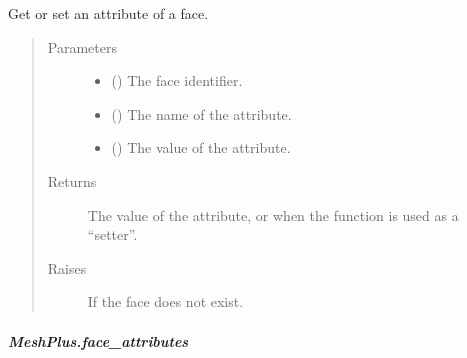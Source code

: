 \documentclass[letterpaper,10pt,english]{sphinxmanual}
\begin{document}
\begin{fulllineitems}
\begin{fulllineitems}
\label{\detokenize{api/generated/directional_clustering.mesh.MeshPlus.face_attribute:directional_clustering.mesh.MeshPlus.face_attribute}}
Get or set an attribute of a face.
\begin{quote}\begin{description}
\item[{Parameters}] \leavevmode\begin{itemize}
\item {} 
 () \textendash{} The face identifier.

\item {} 
 () \textendash{} The name of the attribute.

\item {} 
 () \textendash{} The value of the attribute.

\end{itemize}

\item[{Returns}] \leavevmode
{} \textendash{} The value of the attribute, or  when the function is used as a “setter”.

\item[{Raises}] \leavevmode
{} \textendash{} If the face does not exist.

\end{description}\end{quote}

\end{fulllineitems}



\subparagraph{MeshPlus.face\_attributes}
\label{\detokenize{api/generated/directional_clustering.mesh.MeshPlus.face_attributes:meshplus-face-attributes}}\label{\detokenize{api/generated/directional_clustering.mesh.MeshPlus.face_attributes::doc}}


\end{fulllineitems}
\end{document}

